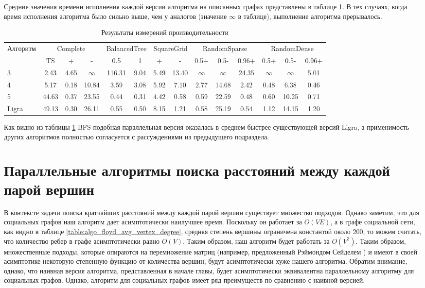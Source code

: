 \FloatBarrier
Средние значения времени исполнения каждой версии алгоритма на описанных графах представлены в таблице \ref{graph_description}. В тех случаях, когда время исполнения алгоритма было сильно выше, чем у аналогов (значение $\infty$ в таблице), выполнение алгоритма прерывалось.
\begin{table}[H]
\centering
\caption{Результаты измерений производительности}
\begin{tabular}{l|ccc|cc|cc|ccc|ccc}  
\hline
Алгоритм & \multicolumn{3}{c}{Complete} & \multicolumn{2}{c}{BalancedTree} & \multicolumn{2}{c}{SquareGrid} & \multicolumn{3}{c}{RandomSparse} & \multicolumn{3}{c}{RandomDense}\\
& TS & + & - & 0.5 & 1 & + & - & 0.5+  & 0.5- & 0.96+ & 0.5+ & 0.5- & 0.96+\\
\hline\hline
3 & 2.43 & 4.65 & $\infty$ & 116.31 & 9.04 & 5.49 & 13.40 & $\infty$ & $\infty$ & 24.35 & $\infty$ & $\infty$ & 5.01 \\  
4 & 5.17 & 0.18 & 10.84 & 3.59 & 3.08 & 5.92 & 7.10 & 2.77 & 14.68 & 2.42 & 0.48  & 6.38  & 0.46 \\
5 & 44.63 & 0.37 & 23.55 & 0.44 & 0.31 & 4.42 & 0.58 & 0.59 & 22.59 & 0.48  & 0.60  & 10.25 & 0.71 \\
Ligra & 49.13 & 0.30 & 26.11 & 0.55 & 0.50 & 8.15 & 1.21 & 0.58 & 25.19 & 0.54  & 1.12  & 14.15 & 1.20 \\
\hline
\end{tabular}

\label{graph_description}
\end{table}

Как видно из таблицы \ref{graph_description} BFS-подобная параллельная версия оказалась в среднем быстрее существующей версий Ligra, а применимость других алгоритмов полностью согласуется с рассуждениями из предыдущего подраздела.  

\FloatBarrier
\section{Параллельные алгоритмы поиска расстояний между каждой парой вершин}



В контексте задачи поиска кратчайших расстояний между каждой парой вершин существует множество подходов. Однако заметим, что для социальных графов наш алгоритм дает асимптотически наилучшее время. Поскольку он работает за $O(VE)$, а в графе социальной сети, как видно в таблице \ref{table:algo_floyd_avg_vertex_degree}, средняя степень вершины ограничена константой около 200, то можем считать, что количество ребер в графе асимптотически равно $O(V)$. Таким образом, наш алгоритм будет работать за $O(V^2)$. Таким образом, множественные подходы, которые опираются на перемножение матриц (например, предложенный Рэймондом Сейделем \cite{SEIDEL}) и имеют в своей асимптотике некоторую степенную функцию от количества вершин, будут асимптотически хуже нашего алгоритма. Обратим внимание, однако, что наивная версия алгоритма, представленная в начале главы, будет асимптотически эквивалентна параллельному алгоритму для социальных графов. Однако, алгоритм для социальных графов имеет ряд преимуществ по сравнению с наивной версией. 


